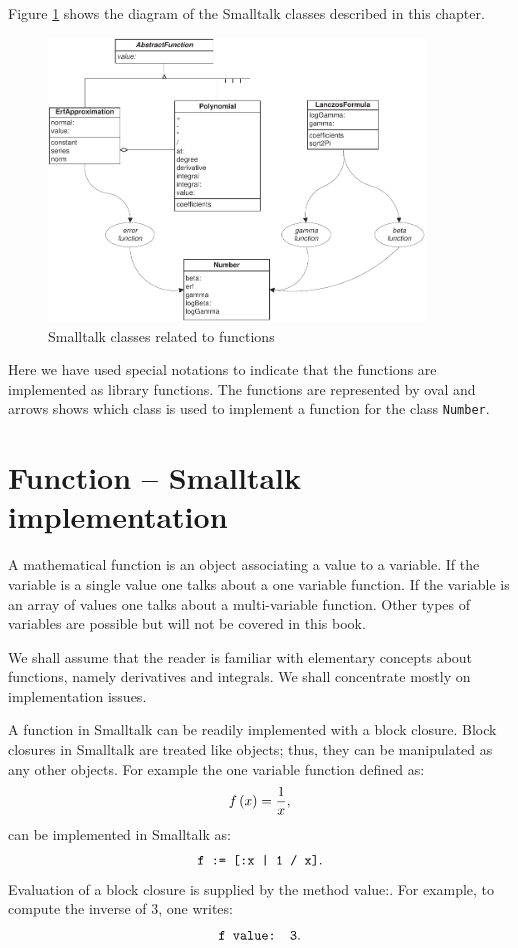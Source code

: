 \documentclass[twoside]{book}
\begin{document}
Figure \ref{fig:functions} shows the diagram of the Smalltalk classes
described in this chapter.
\begin{figure}
\centering\includegraphics[width=10cm]{Figures/FunctionS}
\caption{Smalltalk classes related to functions}
\label{fig:functions}
\end{figure}
Here we have used special notations to indicate that the functions
are implemented as library functions. The functions are
represented by oval and arrows shows which class is used to
implement a function for the class {\tt Number}.

\section{Function -- Smalltalk implementation}
\label{sec:stFunction}
A mathematical function is an object
associating a value to a variable. If the variable is a single
value one talks about a one variable function. If the variable is
an array of values one talks about a multi-variable function.
Other types of variables are possible but will not be covered in
this book.

We shall assume that the reader is familiar with elementary
concepts about functions, namely derivatives and integrals. We
shall concentrate mostly on implementation issues.

 A function in Smalltalk
can be readily implemented with a block closure. Block closures in
Smalltalk are treated like objects; thus, they can be manipulated
as any other objects. For example the one variable function
defined as:
\begin{equation}
f\left( x \right)={1 \over x},
\end{equation}
can be implemented in Smalltalk as:
\begin{equation}
\hbox{\tt f := [:x | 1 / x]}.
\end{equation}
Evaluation of a block closure is supplied by the method value:.
For example, to compute the inverse of 3, one writes:
\begin{equation}
\hbox{\tt f value: 3}.
\end{equation}
\end{document}
